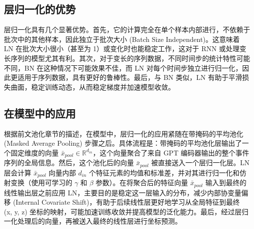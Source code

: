 \subsection{层归一化的优势}

层归一化具有几个显著优势。首先，它的计算完全在单个样本内部进行，不依赖于批次中的其他样本，因此独立于批次大小 (Batch Size Independent)。这意味着 LN 在批次大小很小（甚至为 1）或变化时也能稳定工作，这对于 RNN 或处理变长序列的模型尤其有利。其次，对于变长的序列数据，不同时间步的统计特性可能不同，BN 在这种情况下可能效果不佳，而 LN 对每个时间步独立进行归一化，因此更适用于序列数据，具有更好的鲁棒性。最后，与 BN 类似，LN 有助于平滑损失曲面，稳定训练动态，从而稳定梯度并加速模型收敛。

\subsection{在模型中的应用}

根据前文池化章节的描述，在模型中，层归一化的应用紧随在带掩码的平均池化 (Masked Average Pooling) 步骤之后。具体流程是：带掩码的平均池化层输出了一个固定维度的向量 $\bar{x}_{pool} \in \mathbb{R}^{d_{in}}$，这个向量聚合了来自 GPT 编码器输出的整个事件序列的全局信息。然后，这个池化后的向量 $\bar{x}_{pool}$ 被直接送入一个层归一化层。LN 层会计算 $\bar{x}_{pool}$ 向量内部 $d_{in}$ 个特征元素的均值和标准差，并对其进行归一化和仿射变换（使用可学习的 $\gamma$ 和 $\beta$ 参数）。在将聚合后的特征向量 $\bar{x}_{pool}$ 输入到最终的线性输出层之前应用 LN，主要目的是稳定这一层输入的分布，减少内部协变量偏移 (Internal Covariate Shift)，有助于后续线性层更好地学习从全局特征到最终 (x, y, z) 坐标的映射，可能加速训练收敛并提高模型的泛化能力。最后，经过层归一化处理后的向量，再被送入最终的线性层进行坐标预测。



    
